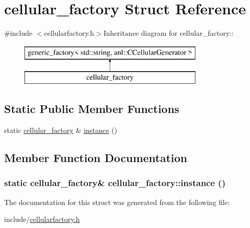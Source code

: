 \hypertarget{structcellular__factory}{
\section{cellular\_\-factory Struct Reference}
\label{structcellular__factory}
}


{\ttfamily \#include $<$cellularfactory.h$>$}Inheritance diagram for cellular\_\-factory::\begin{figure}[H]
\begin{center}
\leavevmode
\includegraphics[height=2cm]{structcellular__factory}
\end{center}
\end{figure}
\subsection*{Static Public Member Functions}
\begin{DoxyCompactItemize}
\item 
static \hyperlink{structcellular__factory}{cellular\_\-factory} \& \hyperlink{structcellular__factory_ab531f89927bd9773a71daee267a78135}{instance} ()
\end{DoxyCompactItemize}


\subsection{Member Function Documentation}
\hypertarget{structcellular__factory_ab531f89927bd9773a71daee267a78135}{
\subsubsection[{instance}]{\setlength{\rightskip}{0pt plus 5cm}static {\bf cellular\_\-factory}\& cellular\_\-factory::instance ()}}
\label{structcellular__factory_ab531f89927bd9773a71daee267a78135}


The documentation for this struct was generated from the following file:\begin{DoxyCompactItemize}
\item 
include/\hyperlink{cellularfactory_8h}{cellularfactory.h}\end{DoxyCompactItemize}
